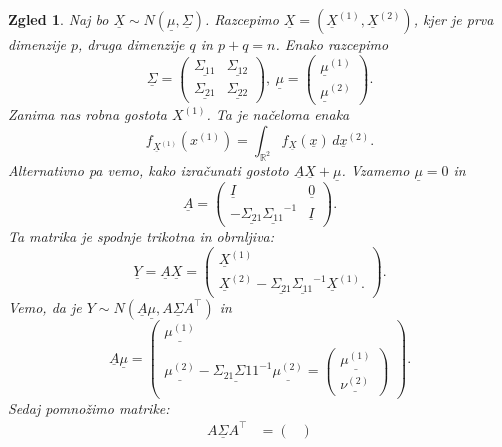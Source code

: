 \documentclass[10pt, a4paper]{article}
\newtheorem{zgled}[izr]{Zgled}
\newcommand{\R}{\mathbb {R}}
\begin{document}
  \begin{zgled}
    Naj bo $\underline{X} \sim N(\underline{\mu}, \underline{\Sigma})$.
    Razcepimo $\underline{X} = (\underline{X}^{(1)}, \underline{X}^{(2)})$, kjer
    je prva dimenzije $p$, druga dimenzije $q$ in $p + q = n$.
    Enako razcepimo 
    $$\underline{\Sigma} = \begin{pmatrix}
      \underline{\Sigma_{11}} & \underline{\Sigma_{12}}\\
      \underline{\Sigma_{21}} & \underline{\Sigma_{22}}
    \end{pmatrix},\ \underline{\mu} = \begin{pmatrix}
      \underline{\mu}^{(1)}\\ \underline{\mu}^{(2)}
    \end{pmatrix}.$$
    Zanima nas robna gostota $X^{(1)}$. Ta je načeloma enaka 
    $$f_{\underline{X}^{(1)}} (x^{(1)}) = \int_{\R^2} f_{\underline{X}} (\underline{x})\, d\underline{x}^{(2)}.$$
    Alternativno pa vemo, kako izračunati gostoto $\underline{A} \underline{X} + \underline{\mu}$.
    Vzamemo $\underline{\mu} = 0$ in 
    $$\underline{A} = \begin{pmatrix}
      \underline{I}& \underline{0}\\
      -\underline{\Sigma_{21}} \underline{\Sigma_{11}}^{-1} & \underline{I}
    \end{pmatrix}.$$    
    Ta matrika je spodnje trikotna in obrnljiva:
    $$\underline{Y} = \underline{A} \underline{X} = \begin{pmatrix}
      \underline{X}^{(1)}\\
      \underline{X}^{(2)} - \underline{\Sigma_{21}}\underline{\Sigma_{11}}^{-1} \underline{X}^{(1)}.
    \end{pmatrix}.$$
    Vemo, da je $Y \sim N(\underline{A} \underline{\mu} , \underline{A \Sigma A}^\top)$ in 
    $$\underline{A} \underline{\mu} = \begin{pmatrix}
      \underline{\mu^{(1)}}\\
      \underline{\mu^{(2)}} - \underline{\Sigma_{21} \Sigma{11}}^{-1} \underline{\mu^{(2)}} = \begin{pmatrix}
        \underline{\mu^{(1)}}\\ \underline{\nu^{(2)}}
      \end{pmatrix}
    \end{pmatrix}.$$
    Sedaj pomnožimo matrike:
    \begin{align*}
      \underline{A \Sigma A}^\top &= \begin{pmatrix}

\end{pmatrix}
\end{align*}
\end{zgled}
\end{document}
